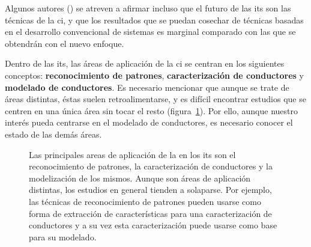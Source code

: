 Algunos autores (\cite{Zhang2011}) se atreven a afirmar incluso que el futuro de las \gls{its} son las técnicas de la \gls{ci}, y que los resultados que se puedan cosechar de técnicas basadas en el desarrollo convencional de sistemas es marginal comparado con las que se obtendrán con el nuevo enfoque.

Dentro de las \gls{its}, las áreas de aplicación de la \gls{ci} se centran en los siguientes conceptos: \textbf{reconocimiento de patrones}, \textbf{caracterización de conductores} y \textbf{modelado de conductores}. Es necesario mencionar que aunque se trate de áreas distintas, éstas suelen retroalimentarse, y es difícil encontrar estudios que se centren en una única área sin tocar el resto (figura~\ref{fig:main-applications-of-ci-in-its}). Por ello, aunque nuestro interés pueda centrarse en el modelado de conductores, es necesario conocer el estado de las demás áreas.

\begin{figure}[t]
	\centering
	\caption[Principales areas de aplicación de la  en los \gls{its}]{Las principales areas de aplicación de la  en los \gls{its} son el reconocimiento de patrones, la caracterización de conductores y la modelización de los mismos. Aunque son áreas de aplicación distintas, los estudios en general tienden a solaparse. Por ejemplo, las técnicas de reconocimiento de patrones pueden usarse como forma de extracción de características para una caracterización de conductores y a su vez esta caracterización puede usarse como base para su modelado.}
	\label{fig:main-applications-of-ci-in-its}
\end{figure}


